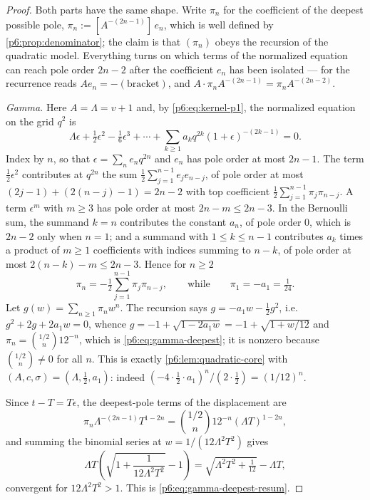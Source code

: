 \documentclass[11pt,a4paper,oneside]{book}
\theoremstyle{plain}
\theoremstyle{definition}
\theoremstyle{remark}
\newcommand{\Coef}[1]{[#1]\,}
\begin{document}
\begin{proof}
Both parts have the same shape.  Write $\pi_n$ for the coefficient of the
deepest possible pole, $\pi_n:=\Coef{A^{-(2n-1)}}e_n$, which is well defined
by \cref{p6:prop:denominator}; the claim is that $(\pi_n)$ obeys the
recursion of the quadratic model.  Everything turns on which terms of the
normalized equation can reach pole order $2n-2$ after the coefficient
$e_n$ has been isolated --- for the recurrence reads $Ae_n=-(\text{bracket})$,
and $A\cdot\pi_nA^{-(2n-1)}=\pi_nA^{-(2n-2)}$.

\emph{Gamma.}  Here $A=\Lambda=v+1$ and, by \eqref{p6:eq:kernel-p1}, the
normalized equation on the grid $q^{2}$ is
\begin{equation}\label{p6:eq:gamma-normalized-again}
 \Lambda\epsilon+\tfrac12\epsilon^{2}-\tfrac16\epsilon^{3}+\cdots
 +\sum_{k\ge1}a_kq^{2k}(1+\epsilon)^{-(2k-1)}=0 .
\end{equation}
Index by $n$, so that $\epsilon=\sum_ne_nq^{2n}$ and $e_n$ has pole order at
most $2n-1$.  The term $\tfrac12\epsilon^{2}$ contributes at $q^{2n}$ the sum
$\tfrac12\sum_{j=1}^{n-1}e_je_{n-j}$, of pole order at most
$(2j-1)+(2(n-j)-1)=2n-2$ with top coefficient
$\tfrac12\sum_{j=1}^{n-1}\pi_j\pi_{n-j}$.  A term $\epsilon^{m}$ with $m\ge3$
has pole order at most $2n-m\le2n-3$.  In the Bernoulli sum, the summand
$k=n$ contributes the constant $a_n$, of pole order $0$, which is $2n-2$ only
when $n=1$; and a summand with $1\le k\le n-1$ contributes $a_k$ times a
product of $m\ge1$ coefficients with indices summing to $n-k$, of pole order
at most $2(n-k)-m\le2n-3$.  Hence for $n\ge2$
\[
 \pi_n=-\tfrac12\sum_{j=1}^{n-1}\pi_j\pi_{n-j},
 \qquad\text{while}\qquad \pi_1=-a_1=\tfrac1{24}.
\]
Let $g(w)=\sum_{n\ge1}\pi_nw^{n}$.  The recursion says
$g=-a_1w-\tfrac12g^{2}$, i.e.\ $g^{2}+2g+2a_1w=0$, whence
$g=-1+\sqrt{1-2a_1w}=-1+\sqrt{1+w/12}$ and
$\pi_n=\binom{1/2}{n}12^{-n}$, which is \eqref{p6:eq:gamma-deepest}; it is
nonzero because $\binom{1/2}{n}\ne0$ for all $n$.  This is exactly
\cref{p6:lem:quadratic-core} with $(A,c,\sigma)=(\Lambda,\tfrac12,a_1)$:
indeed $(-4\cdot\tfrac12\cdot a_1)^{n}/(2\cdot\tfrac12)=(1/12)^{n}$.

Since $t-T=T\epsilon$, the deepest-pole terms of the displacement are
\[
 \pi_n\Lambda^{-(2n-1)}T^{1-2n}
 =\binom{1/2}{n}12^{-n}(\Lambda T)^{1-2n},
\]
and summing the binomial series at $w=1/(12\Lambda^{2}T^{2})$ gives
\[
 \Lambda T\left(\sqrt{1+\frac1{12\Lambda^{2}T^{2}}}-1\right)
 =\sqrt{\Lambda^{2}T^{2}+\tfrac1{12}}-\Lambda T,
\]
convergent for $12\Lambda^{2}T^{2}>1$.  This is
\eqref{p6:eq:gamma-deepest-resum}.


\end{proof}
\end{document}
